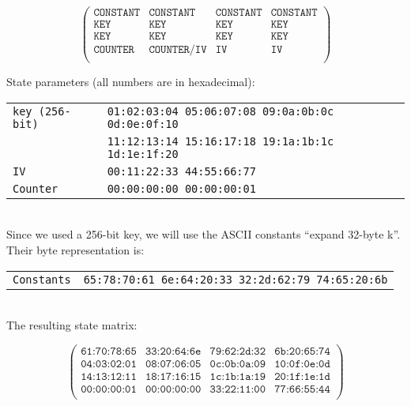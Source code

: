 \begin{equation*}
\begin{pmatrix}
\texttt{CONSTANT}& \texttt{CONSTANT} & \texttt{CONSTANT} & \texttt{CONSTANT} \\
\texttt{KEY} & \texttt{KEY} & \texttt{KEY} & \texttt{KEY} \\
\texttt{KEY} & \texttt{KEY} & \texttt{KEY} & \texttt{KEY} \\
\texttt{COUNTER} & \texttt{COUNTER/IV} & \texttt{IV} & \texttt{IV} \\
\end{pmatrix}
\end{equation*}

\pagebreak

\begin{example} State parameters (all numbers are in hexadecimal):

\begin{tabular}{ l l }
 \texttt{key (256-bit)} & \texttt{01:02:03:04 05:06:07:08 09:0a:0b:0c 0d:0e:0f:10} \\ 
 & \texttt{11:12:13:14 15:16:17:18 19:1a:1b:1c 1d:1e:1f:20}\\
 \texttt{IV} & \texttt{00:11:22:33 44:55:66:77} \\  
\texttt{Counter} & \texttt{00:00:00:00 00:00:00:01} \\
\end{tabular}
\\

\noindent Since we used a 256-bit key, we will use the ASCII constants ``expand 32-byte k''. Their byte representation is:\\

\begin{tabular}{ l l }
\texttt{Constants\phantom{MMMM}} & \texttt{65:78:70:61 6e:64:20:33 32:2d:62:79 74:65:20:6b} \\
\end{tabular}
\\

\noindent The resulting state matrix:

\begin{equation*}
\begin{pmatrix}
\texttt{61:70:78:65}& \texttt{33:20:64:6e} & \texttt{79:62:2d:32} & \texttt{6b:20:65:74} \\
\texttt{04:03:02:01} & \texttt{08:07:06:05} & \texttt{0c:0b:0a:09} & \texttt{10:0f:0e:0d} \\
\texttt{14:13:12:11} & \texttt{18:17:16:15} & \texttt{1c:1b:1a:19} & \texttt{20:1f:1e:1d} \\
\texttt{00:00:00:01} & \texttt{00:00:00:00} & \texttt{33:22:11:00} & \texttt{77:66:55:44} \\
\end{pmatrix}
\end{equation*}

\end{example}

